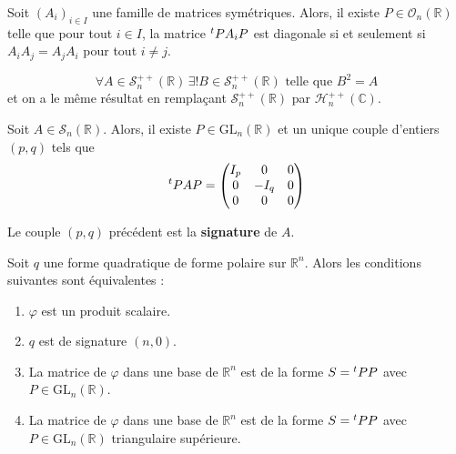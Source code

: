   \begin{application}
    Soit $(A_i)_{i \in I}$ une famille de matrices symétriques. Alors, il existe $P \in \mathcal{O}_n(\mathbb{R})$ telle que pour tout $i \in I$, la matrice $\mathstrut ^t P A_i P$ est diagonale si et seulement si $A_i A_j = A_j A_i$ pour tout $i \neq j$.
  \end{application}


  \begin{application}
    \[ \forall A \in \mathcal{S}_n^{++}(\mathbb{R}) \, \exists! B \in \mathcal{S}_n^{++}(\mathbb{R}) \text{ telle que } B^2 = A \]
    et on a le même résultat en remplaçant $\mathcal{S}_n^{++}(\mathbb{R})$ par $\mathcal{H}_n^{++}(\mathbb{C})$.
  \end{application}


  \begin{theorem}
    Soit $A \in \mathcal{S}_n(\mathbb{R})$. Alors, il existe $P \in \mathrm{GL}_n(\mathbb{R})$ et un unique couple d'entiers $(p,q)$ tels que
    \[ \mathstrut ^t PAP = \begin{pmatrix} I_p & 0 & 0 \\ 0 & -I_q & 0 \\ 0 & 0 & 0 \end{pmatrix} \]
  \end{theorem}

  \begin{definition}
    Le couple $(p,q)$ précédent est la \textbf{signature} de $A$.
  \end{definition}

  \begin{proposition}
    Soit $q$ une forme quadratique de forme polaire sur $\mathbb{R}^n$. Alors les conditions suivantes sont équivalentes :
    \begin{enumerate}[label={\bfseries(\roman*)}]
      \item $\varphi$ est un produit scalaire.
      \item $q$ est de signature $(n,0)$.
      \item La matrice de $\varphi$ dans une base de $\mathbb{R}^n$ est de la forme $S = \mathstrut ^t PP$ avec $P \in \mathrm{GL}_n(\mathbb{R})$.
      \item La matrice de $\varphi$ dans une base de $\mathbb{R}^n$ est de la forme $S = \mathstrut ^t PP$ avec $P \in \mathrm{GL}_n(\mathbb{R})$ triangulaire supérieure.
    \end{enumerate}
  \end{proposition}

